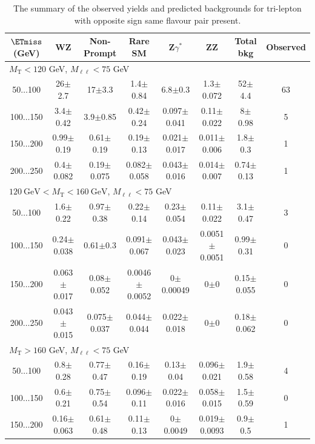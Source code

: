 \begin{landscape}
\begin{table}
\begin{center}
\caption{\label{tab:OSSF1tau0} The summary of the observed yields and predicted backgrounds for tri-lepton with opposite sign same flavour pair present. }
\begin{tabular}{| c | c c c c c c c | }\hline\hline
$\ETmiss$ (GeV) & WZ & Non-Prompt & Rare SM & Z$\gamma^*$ & ZZ & Total bkg & Observed\\\hline\hline
\multicolumn{7}{l}{$M_{\text{T}} < 120$ GeV, $M_{\ell\ell} < 75$ GeV}\\\hline\hline
50$\dots$100&26$\pm$2.7&17$\pm$3.3&1.4$\pm$0.84&6.8$\pm$0.3&1.3$\pm$0.072&52$\pm$4.4&63\\
100$\dots$150&3.4$\pm$0.42&3.9$\pm$0.85&0.42$\pm$0.24&0.097$\pm$0.041&0.11$\pm$0.022&8$\pm$0.98&5\\
150$\dots$200&0.99$\pm$0.19&0.61$\pm$0.19&0.19$\pm$0.13&0.021$\pm$0.017&0.011$\pm$0.006&1.8$\pm$0.3&1\\
200$\dots$250&0.4$\pm$0.082&0.19$\pm$0.075&0.082$\pm$0.058&0.043$\pm$0.016&0.014$\pm$0.007&0.74$\pm$0.13&1\\
\hline\hline
\multicolumn{7}{l}{$120~\mathrm{GeV} < M_{\text{T}} < 160~\mathrm{GeV}$, $M_{\ell\ell} < 75$ GeV}\\\hline\hline
50$\dots$100&1.6$\pm$0.22&0.97$\pm$0.38&0.22$\pm$0.14&0.23$\pm$0.054&0.11$\pm$0.022&3.1$\pm$0.47&3\\
100$\dots$150&0.24$\pm$0.038&0.61$\pm$0.3&0.091$\pm$0.067&0.043$\pm$0.023&0.0051$\pm$0.0051&0.99$\pm$0.31&0\\
150$\dots$200&0.063$\pm$0.017&0.08$\pm$0.052&0.0046$\pm$0.0052&0$\pm$0.00049&0$\pm$0&0.15$\pm$0.055&0\\
200$\dots$250&0.043$\pm$0.015&0.075$\pm$0.037&0.044$\pm$0.044&0.022$\pm$0.018&0$\pm$0&0.18$\pm$0.062&0\\
\hline\hline
\multicolumn{7}{l}{$M_{\text{T}} > 160$ GeV, $M_{\ell\ell} < 75$ GeV}\\\hline\hline
50$\dots$100&0.8$\pm$0.28&0.77$\pm$0.47&0.16$\pm$0.19&0.13$\pm$0.04&0.096$\pm$0.021&1.9$\pm$0.58&4\\
100$\dots$150&0.6$\pm$0.21&0.75$\pm$0.54&0.096$\pm$0.11&0.022$\pm$0.016&0.058$\pm$0.015&1.5$\pm$0.59&0\\
150$\dots$200&0.16$\pm$0.063&0.61$\pm$0.48&0.11$\pm$0.13&0$\pm$0.0049&0.019$\pm$0.0093&0.9$\pm$0.5&1\\

\end{tabular}
\end{center}
\end{table}
\end{landscape}
